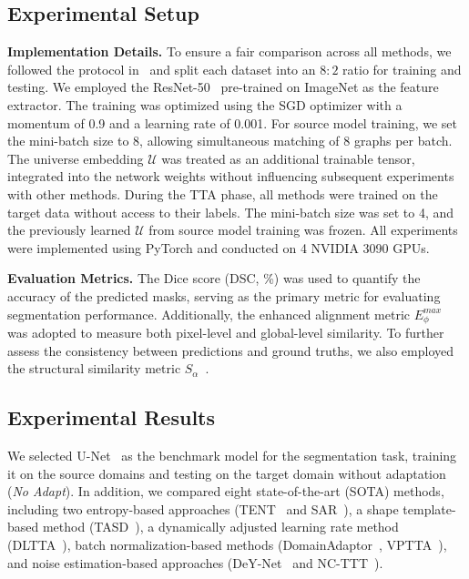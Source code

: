 \subsection{Experimental Setup}
\label{exp_setup}
\textbf{Implementation Details.} To ensure a fair comparison across all methods, we followed the protocol in~\cite{chen2024each} and split each dataset into an $8:2$ ratio for training and testing. We employed the ResNet-50~\cite{he2016deep} pre-trained on ImageNet as the feature extractor. The training was optimized using the SGD optimizer with a momentum of 0.9 and a learning rate of 0.001. For source model training, we set the mini-batch size to 8, allowing simultaneous matching of 8 graphs per batch. The universe embedding $\mathcal{U}$ was treated as an additional trainable tensor, integrated into the network weights without influencing subsequent experiments with other methods.
During the TTA phase, all methods were trained on the target data without access to their labels. The mini-batch size was set to 4, and the previously learned $\mathcal{U}$ from source model training was frozen. All experiments were implemented using PyTorch and conducted on 4 NVIDIA 3090 GPUs.

\noindent \textbf{Evaluation Metrics.} The Dice score (DSC, \%) was used to quantify the accuracy of the predicted masks, serving as the primary metric for evaluating segmentation performance. Additionally, the enhanced alignment metric $E_\phi^{max}$~\cite{fan2018enhanced} was adopted to measure both pixel-level and global-level similarity. To further assess the consistency between predictions and ground truths, we also employed the structural similarity metric $S_{\alpha}$~\cite{fan2017structure}.

\subsection{Experimental Results}
We selected U-Net~\cite{ronneberger2015u} as the benchmark model for the segmentation task, training it on the source domains and testing on the target domain without adaptation (\textit{No Adapt}). In addition, we compared eight state-of-the-art (SOTA) methods, including two entropy-based approaches (TENT~\cite{wangtent} and SAR~\cite{niu2023towards}), a shape template-based method (TASD~\cite{liu2022single}), a dynamically adjusted learning rate method (DLTTA~\cite{yang2022dltta}), batch normalization-based methods (DomainAdaptor~\cite{zhang2023domainadaptor}, VPTTA~\cite{chen2024each}), and noise estimation-based approaches (DeY-Net~\cite{wen2024denoising} and NC-TTT~\cite{osowiechi2024nc}).


